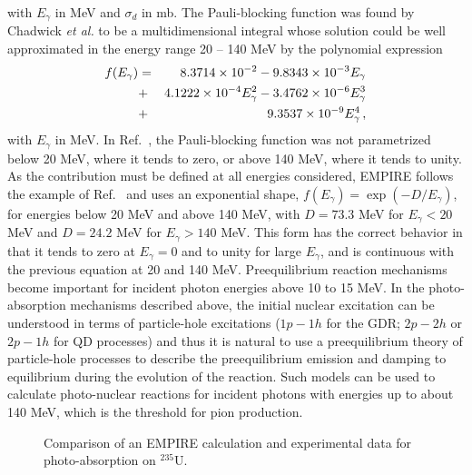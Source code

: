 with $E_{\gamma}$ in MeV and $\sigma_{d}$ in mb. The Pauli-blocking function
was found by Chadwick \emph{et al.} to be a multidimensional integral whose
solution could be well approximated in the energy range 20 -- 140 MeV by the
polynomial expression
\begin{eqnarray}
f(E_{\gamma}) & = & \;8.3714\times10^{-2}-9.8343\times10^{-3}E_{\gamma}
\notag \\
&+&4.1222\times10^{-4}E_{\gamma}^{2} -3.4762\times10^{-6}E_{\gamma}^{3}
\notag \\
&+&9.3537\times10^{-9}E_{\gamma}^{4}\,,
\end{eqnarray}
with $E_{\gamma}$ in MeV. In Ref.~\cite{chadQD}, the Pauli-blocking function
was not parametrized below 20 MeV, where it tends to zero, or above 140 MeV,
where it tends to unity. As the contribution must be defined at all
energies considered, EMPIRE follows the example of Ref.~\cite{PHNuc} and
uses an exponential shape, $f(E_{\gamma})=\exp(-D/E_{\gamma})$, for energies
below 20 MeV and above 140 MeV, with $D=73.3$ MeV for $E_{\gamma}<20$ MeV
and $D=24.2$ MeV for $E_{\gamma}>140$ MeV. This form has the correct
behavior in that it tends to zero at $E_{\gamma}=0$ and to unity for large $%
E_{\gamma}$, and is continuous with the previous equation at 20 and 140 MeV.
Preequilibrium reaction mechanisms become important for incident photon
energies above 10 to 15 MeV. In the photo-absorption mechanisms described
above, the initial nuclear excitation can be understood in terms of
particle-hole excitations ($1p-1h$ for the GDR; $2p-2h$ or $2p-1h$ for QD
processes) and thus it is natural to use a preequilibrium theory of
particle-hole processes to describe the preequilibrium emission and damping
to equilibrium during the evolution of the reaction. Such models can be used
to calculate photo-nuclear reactions for incident photons with energies up
to about 140 MeV, which is the threshold for pion production.
\begin{figure}[htbp]
\caption{Comparison of an EMPIRE calculation and experimental data for
photo-absorption on $^{235}$U.}
\label{u235abs}
\end{figure}

